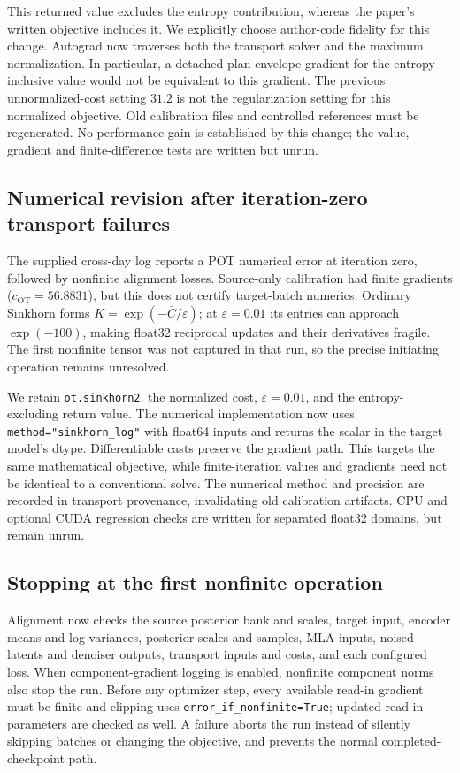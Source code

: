 \documentclass[11pt,a4paper]{article}
\begin{document}
This returned value excludes the entropy contribution, whereas the paper's
written objective includes it. We explicitly choose author-code fidelity
for this change. Autograd now traverses both the transport solver and
the maximum normalization. In particular, a detached-plan envelope gradient
for the entropy-inclusive value would not be equivalent to this gradient.
The previous unnormalized-cost setting $31.2$ is not the regularization
setting for this normalized objective. Old calibration files and controlled
references must be regenerated. No performance gain is established by this
change; the value, gradient and finite-difference tests are written but unrun.

\subsection{Numerical revision after iteration-zero transport failures}

The supplied cross-day log reports a POT numerical error at iteration zero,
followed by nonfinite alignment losses. Source-only calibration had finite
gradients ($c_{\mathrm{OT}}=56.8831$), but this does not certify target-batch
numerics. Ordinary Sinkhorn forms $K=\exp(-\bar C/\varepsilon)$; at
$\varepsilon=0.01$ its entries can approach $\exp(-100)$, making float32
reciprocal updates and their derivatives fragile. The first nonfinite tensor
was not captured in that run, so the precise initiating operation remains
unresolved.

We retain \texttt{ot.sinkhorn2}, the normalized cost, $\varepsilon=0.01$,
and the entropy-excluding return value. The numerical implementation now uses
\texttt{method="sinkhorn\_log"} with float64 inputs and returns the scalar in
the target model's dtype. Differentiable casts preserve the gradient path.
This targets the same mathematical objective, while finite-iteration values
and gradients need not be identical to a conventional solve. The numerical
method and precision are recorded in transport provenance, invalidating old
calibration artifacts. CPU and optional CUDA regression checks are written
for separated float32 domains, but remain unrun.

\subsection{Stopping at the first nonfinite operation}

Alignment now checks the source posterior bank and scales, target input,
encoder means and log variances, posterior scales and samples, MLA inputs,
noised latents and denoiser outputs, transport inputs and costs, and each
configured loss. When component-gradient logging is enabled, nonfinite
component norms also stop the run. Before any optimizer step, every available
read-in gradient must be finite and clipping uses
\texttt{error\_if\_nonfinite=True}; updated read-in parameters are checked
as well. A failure aborts the run instead of silently skipping batches or
changing the objective, and prevents the normal completed-checkpoint path.
\end{document}
